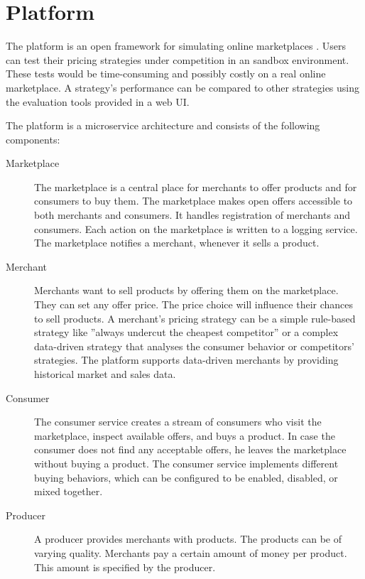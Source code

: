 
\chapter{\pricewars Platform}

The \pricewars platform is an open framework for simulating online marketplaces \cite{edoc2017pricewars}.
Users can test their pricing strategies under competition in an sandbox environment.
These tests would be time-consuming and possibly costly on a real online marketplace.
A strategy's performance can be compared to other strategies using the evaluation tools provided in a web UI.

The \pricewars platform is a microservice architecture and consists of the following components:
\begin{description}
	\item [Marketplace]
		The marketplace is a central place for merchants to offer products and for consumers to buy them.
		The marketplace makes open offers accessible to both merchants and consumers.
		It handles registration of merchants and consumers.
		Each action on the marketplace is written to a logging service.
		The marketplace notifies a merchant, whenever it sells a product.
	\item [Merchant]
		Merchants want to sell products by offering them on the marketplace.
		They can set any offer price.
		The price choice will influence their chances to sell products.
		A merchant's pricing strategy can be a simple rule-based strategy like ''always undercut the cheapest competitor'' or a complex data-driven strategy that analyses the consumer behavior or competitors' strategies.
		The \pricewars platform supports data-driven merchants by providing historical market and sales data.
	\item [Consumer]
		The consumer service creates a stream of consumers who visit the marketplace, inspect available offers, and buys a product.
		In case the consumer does not find any acceptable offers, he leaves the marketplace without buying a product.
		The consumer service implements different buying behaviors, which can be configured to be enabled, disabled, or mixed together.
	\item [Producer]
		A producer provides merchants with products.
		The products can be of varying quality.
		Merchants pay a certain amount of money per product.
		This amount is specified by the producer.

\end{description}

